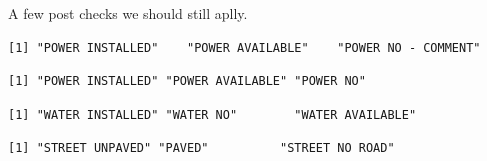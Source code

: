 \documentclass[
  english,
  letterpaper,
  DIV=11,
  numbers=noendperiod]{scrreprt}
\newenvironment{Shaded}{\begin{snugshade}}{\end{snugshade}}
\newcommand{\AttributeTok}[1]{\textcolor[rgb]{0.40,0.45,0.13}{#1}}
\newcommand{\FunctionTok}[1]{\textcolor[rgb]{0.28,0.35,0.67}{#1}}
\newcommand{\NormalTok}[1]{\textcolor[rgb]{0.00,0.23,0.31}{#1}}
\newcommand{\OtherTok}[1]{\textcolor[rgb]{0.00,0.23,0.31}{#1}}
\newcommand{\SpecialCharTok}[1]{\textcolor[rgb]{0.37,0.37,0.37}{#1}}
\newcommand{\StringTok}[1]{\textcolor[rgb]{0.13,0.47,0.30}{#1}}
\begin{document}
A few post checks we should still aplly.

\begin{Shaded}
\end{Shaded}

\begin{verbatim}
[1] "POWER INSTALLED"    "POWER AVAILABLE"    "POWER NO - COMMENT"
\end{verbatim}

\begin{Shaded}
\end{Shaded}

\begin{verbatim}
[1] "POWER INSTALLED" "POWER AVAILABLE" "POWER NO"       
\end{verbatim}

\begin{Shaded}
\end{Shaded}

\begin{verbatim}
[1] "WATER INSTALLED" "WATER NO"        "WATER AVAILABLE"
\end{verbatim}

\begin{Shaded}
\end{Shaded}

\begin{verbatim}
[1] "STREET UNPAVED" "PAVED"          "STREET NO ROAD"
\end{verbatim}
\end{document}
